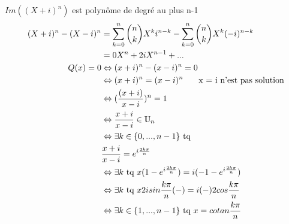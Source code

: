 \documentclass{article}
\begin{document}
\(Im((X+i)^n)\) est polynôme de degré au plus n-1
\begin{align*}
    (X+i)^n - (X-i)^n &= \sum_{k=0}^{n}\binom{n}{k}X^ki^{n-k} - \sum_{k=0}^{n}\binom{n}{k}X^k(-i)^{n-k}\\
    &= 0X^n + 2iX^{n-1} + ... \\
    Q(x) = 0 &\Leftrightarrow (x+i)^n - (x-i)^n = 0\\
    &\Leftrightarrow (x+i)^n = (x-i)^n \indent \text{ x = i n'est pas solution}\\
    &\Leftrightarrow (\frac{(x+i)}{x-i})^n = 1\\
    &\Leftrightarrow \frac{x+i}{x-i} \in \mathbb{U}_n\\
    &\Leftrightarrow \exists k \in \{0,...,n-1\} \text{ tq}\\
    &\frac{x+i}{x-i} = e^{i\frac{2k\pi}{n}}\\
    &\Leftrightarrow \exists k \text{ tq } x(1-e^{i\frac{2k\pi}{n}}) = i(-1-e^{i\frac{2k\pi}{n}})\\
    &\Leftrightarrow \exists k \text{ tq } x2isin\frac{k\pi}{n}(-) = i(-)2cos\frac{k\pi}{n}\\
    &\Leftrightarrow \exists k \in \{1,...,n-1\} \text{ tq } x = cotan\frac{k\pi}{n}
\end{align*}
\end{document}
